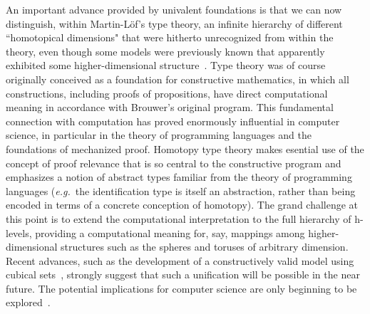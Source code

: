 \documentclass[11pt]{article}
\theoremstyle{remark}
\theoremstyle{definition}
\begin{document}
An important advance provided by univalent foundations is that we can now distinguish, within Martin-L\"{o}f's type
theory, an infinite hierarchy of different ``homotopical dimensions" that were hitherto unrecognized from within the
theory, even though some models were previously known that apparently exhibited some higher-dimensional
structure~\cite{HS}.  Type theory was of course originally conceived as a foundation for constructive
mathematics, in which all constructions, including proofs of propositions, have direct computational meaning in
accordance with Brouwer's original program.  This fundamental connection with computation has proved enormously
influential in computer science, in particular in the theory of programming languages and the foundations of mechanized
proof.  Homotopy type theory makes esential use of the concept of proof relevance that is so central to the constructive
program and emphasizes a notion of abstract types familiar from the theory of programming languages (\textit{e.g.}\ the
identification type is itself an abstraction, rather than being encoded in terms of a concrete conception of homotopy).
The grand challenge at this point is to extend the computational interpretation to the full hierarchy of h-levels,
providing a computational meaning for, say, mappings among higher-dimensional structures such as the spheres and toruses
of arbitrary dimension.  Recent advances, such as the development of a constructively valid model using cubical
sets~\cite{BCH}, strongly suggest that such a unification will be possible in the near future.  The potential
implications for computer science are only beginning to be explored~\cite{AMLH}.
%
\end{document}
